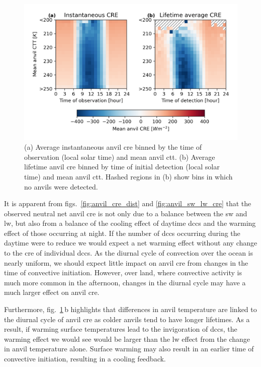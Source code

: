 \begin{figure}[tp]
    \includegraphics[width=\textwidth]{figures/chapter4_16.png}
    \caption[
    Average anvil \acrshort{cre} binned by the time of detection (local time) and mean anvil \acrshort{ctt}
    ]{
    (a) Average instantaneous anvil \acrshort{cre} binned by the time of observation (local solar time) and mean anvil \acrshort{ctt}. (b) Average lifetime anvil \acrshort{cre} binned by time of initial detection (local solar time) and mean anvil \acrshort{ctt}. Hashed regions in (b) show bins in which no anvils were detected.
    }
    \label{fig:anvil_cre_time_vs_ctt}
\end{figure}


It is apparent from figs.~\ref{fig:anvil_cre_dist} and \ref{fig:anvil_sw_lw_cre} that the observed neutral net anvil \acrshort{cre} is not only due to a balance between the \acrshort{sw} and \acrshort{lw}, but also from a balance of the cooling effect of daytime \acrshort{dcc}s and the warming effect of those occurring at night. 
If the number of \acrshort{dcc}s occurring during the daytime were to reduce we would expect a net warming effect without any change to the \acrshort{cre} of individual \acrshort{dcc}s.
As the diurnal cycle of convection over the ocean is nearly uniform, we should expect little impact on anvil \acrshort{cre} from changes in the time of convective initiation.
However, over land, where convective activity is much more common in the afternoon, changes in the diurnal cycle may have a much larger effect on anvil \acrshort{cre}.

Furthermore, fig.~\ref{fig:anvil_cre_time_vs_ctt}\,b highlights that differences in anvil temperature are linked to the diurnal cycle of anvil \acrshort{cre} as colder anvils tend to have longer lifetimes.
As a result, if warming surface temperatures lead to the invigoration of \acrshort{dcc}s, the warming effect we would see would be larger than the \acrshort{lw} effect from the change in anvil temperature alone. 
Surface warming may also result in an earlier time of convective initiation, resulting in a cooling feedback.


